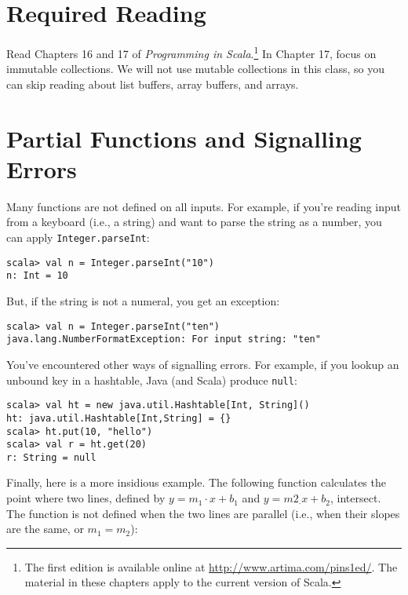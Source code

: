 \documentclass[9pt]{extbook}
\begin{document}
\section{Required Reading}

Read Chapters 16 and 17 of \emph{Programming in Scala}.\footnote{The
  first edition is available online at
  \url{http://www.artima.com/pins1ed/}. The material in these chapters
  apply to the current version of Scala.} In Chapter 17, focus on
immutable collections. We will not use mutable collections in this class, so you can
skip reading about list buffers, array buffers, and arrays.

\section{Partial Functions and Signalling Errors}

\lstset{language=scala}
Many functions are not defined on all inputs. For example, if you're reading
input from a keyboard (i.e., a string) and want to parse the string as a
number, you can apply \lstinline|Integer.parseInt|:

\lstset{language=console}
\begin{lstlisting}
scala> val n = Integer.parseInt("10")
n: Int = 10
\end{lstlisting}

But, if the string is not a numeral, you get an exception:

\begin{lstlisting}
scala> val n = Integer.parseInt("ten")
java.lang.NumberFormatException: For input string: "ten"
\end{lstlisting}

\lstset{language=scala}
You've encountered other ways of signalling errors. For example, if you lookup
an unbound key in a hashtable, Java (and Scala) produce \lstinline|null|:

\lstset{language=console}
\begin{lstlisting}
scala> val ht = new java.util.Hashtable[Int, String]()
ht: java.util.Hashtable[Int,String] = {}
scala> ht.put(10, "hello")
scala> val r = ht.get(20)
r: String = null
\end{lstlisting}

Finally, here is a more insidious example. The following function calculates the
point where two lines, defined by $y = m_1 \cdot x + b_1$ and
$y = m2_ \cdot x + b_2$, intersect.
The function is not defined when the two lines are parallel (i.e., when their
slopes are the same, or $m_1 = m_2$):
\end{document}
